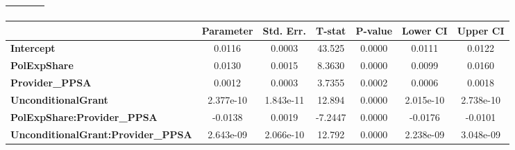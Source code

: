 \begin{center}
\begin{tabular}{lclc}
\textbf{}                                  &                    & \textbf{                     }   &                  \\
\bottomrule
\end{tabular}
\begin{tabular}{lcccccc}
                                           & \textbf{Parameter} & \textbf{Std. Err.} & \textbf{T-stat} & \textbf{P-value} & \textbf{Lower CI} & \textbf{Upper CI}  \\
\midrule
\textbf{Intercept}                         &       0.0116       &       0.0003       &      43.525     &      0.0000      &       0.0111      &       0.0122       \\
\textbf{PolExpShare}                       &       0.0130       &       0.0015       &      8.3630     &      0.0000      &       0.0099      &       0.0160       \\
\textbf{Provider\_PPSA}                    &       0.0012       &       0.0003       &      3.7355     &      0.0002      &       0.0006      &       0.0018       \\
\textbf{UnconditionalGrant}                &     2.377e-10      &     1.843e-11      &      12.894     &      0.0000      &     2.015e-10     &     2.738e-10      \\
\textbf{PolExpShare:Provider\_PPSA}        &      -0.0138       &       0.0019       &     -7.2447     &      0.0000      &      -0.0176      &      -0.0101       \\
\textbf{UnconditionalGrant:Provider\_PPSA} &     2.643e-09      &     2.066e-10      &      12.792     &      0.0000      &     2.238e-09     &     3.048e-09      \\
\bottomrule
\end{tabular}
\end{center}